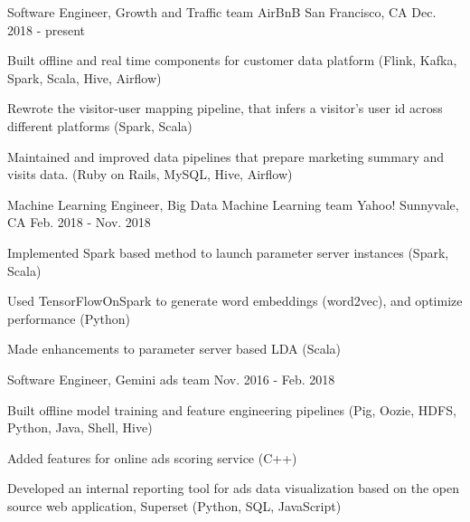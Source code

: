 

\begin{cventries}

  \cventry
    {Software Engineer, Growth and Traffic team} %
    {AirBnB} %
    {San Francisco, CA} %
    {Dec. 2018 - present} %
    {
      \begin{cvitems} %
        \item {Built offline and real time components for customer data platform (Flink, Kafka, Spark, Scala, Hive, Airflow)}
        \item {Rewrote the visitor-user mapping pipeline, that infers a visitor's user id across different platforms (Spark, Scala)}
        \item {Maintained and improved data pipelines that prepare marketing summary and visits data. (Ruby on Rails, MySQL, Hive, Airflow)}
      \end{cvitems}
    }

  \cventry
    {Machine Learning Engineer, Big Data Machine Learning team} %
    {Yahoo!} %
    {Sunnyvale, CA} %
    {Feb. 2018 - Nov. 2018} %
    {
      \begin{cvitems} %
        \item {Implemented Spark based method to launch parameter server instances (Spark, Scala)}
        \item {Used TensorFlowOnSpark to generate word embeddings (word2vec), and optimize performance (Python)}
        \item {Made enhancements to parameter server based LDA (Scala)}
      \end{cvitems}
    }

  \cventry
    {Software Engineer, Gemini ads team} %
    {} %
    {} %
    {Nov. 2016 - Feb. 2018} %
    {
      \begin{cvitems} %
        \item {Built offline model training and feature engineering pipelines (Pig, Oozie, HDFS, Python, Java, Shell, Hive)}
        \item {Added features for online ads scoring service (C++)}
        \item {Developed an internal reporting tool for ads data visualization based on the open source web application,
Superset (Python, SQL, JavaScript)}
      \end{cvitems}
    }
    

\end{cventries}
